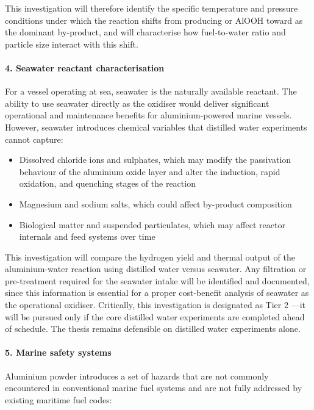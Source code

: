 \documentclass[12pt]{article}
\begin{document}
This investigation will therefore identify the specific temperature and pressure 
conditions under which the reaction shifts from producing  or AlOOH 
toward  as the dominant by-product, and will characterise how 
fuel-to-water ratio and particle size interact with this shift.

\paragraph{4. Seawater reactant characterisation}

For a vessel operating at sea, seawater is the naturally available reactant. The 
ability to use seawater directly as the oxidiser would deliver significant operational 
and maintenance benefits for aluminium-powered marine vessels. However, seawater 
introduces chemical variables that distilled water experiments cannot capture:

\begin{itemize}
    \item Dissolved chloride ions and sulphates, which may modify the passivation 
    behaviour of the aluminium oxide layer and alter the induction, rapid oxidation, 
    and quenching stages of the reaction
    \item Magnesium and sodium salts, which could affect by-product composition
    \item Biological matter and suspended particulates, which may affect reactor 
    internals and feed systems over time
\end{itemize}

This investigation will compare the hydrogen yield and thermal output of the 
aluminium-water reaction using distilled water versus seawater. Any filtration or 
pre-treatment required for the seawater intake will be identified and documented, 
since this information is essential for a proper cost-benefit analysis of seawater 
as the operational oxidiser. Critically, this investigation is designated as Tier 2
---it will be pursued only if the core distilled water experiments are completed 
ahead of schedule. The thesis remains defensible on distilled water experiments 
alone.

\paragraph{5. Marine safety systems}

Aluminium powder introduces a set of hazards that are not commonly encountered in 
conventional marine fuel systems and are not fully addressed by existing maritime 
fuel codes:
\end{document}
